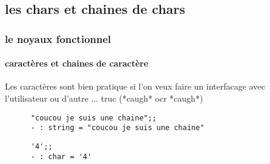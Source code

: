   \subsection{les chars et chaines de chars}
\begin{frame}[fragile]
    \frametitle{le noyaux fonctionnel}
    \framesubtitle{caractères et chaines de caractère}
    Les caractères sont bien pratique si l'on veux faire un interfacage avec l'utilisateur ou d'autre ... truc (*caugh* ocr *caugh*)\\
    \begin{minipage}[t]{10cm}
      \begin{lstlisting}
      "coucou je suis une chaine";;
      - : string = "coucou je suis une chaine"
      \end{lstlisting}
    \end{minipage}
    \begin{minipage}[t]{5cm}
      \begin{lstlisting}
      '4';;
      - : char = '4'
      \end{lstlisting}
    \end{minipage}
\end{frame}
